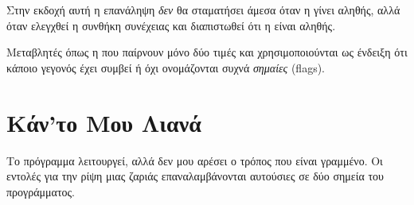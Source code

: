 \documentclass[a4paper,11pt,oneside]{book}
\begin{document}

Στην εκδοχή αυτή η επανάληψη \emph{δεν} θα σταματήσει άμεσα όταν η  γίνει αληθής, αλλά όταν ελεγχθεί η συνθήκη συνέχειας και διαπιστωθεί ότι η  είναι αληθής.

Μεταβλητές όπως η  που παίρνουν μόνο δύο τιμές και χρησιμοποιούνται ως ένδειξη ότι κάποιο γεγονός έχει συμβεί ή όχι ονομάζονται συχνά \emph{σημαίες} (flags).


\section{Κάν'το Μου Λιανά}

\begin{question}
Το πρόγραμμα λειτουργεί, αλλά δεν μου αρέσει ο τρόπος που είναι γραμμένο. Οι εντολές για την ρίψη μιας ζαριάς επαναλαμβάνονται αυτούσιες σε δύο σημεία του προγράμματος. 
\end{question}
\end{document}

